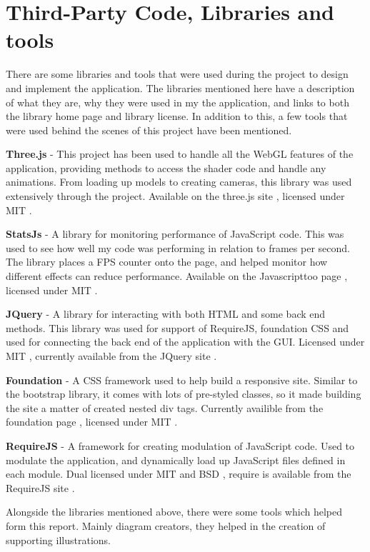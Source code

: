\chapter{Third-Party Code, Libraries and tools}
There are some libraries and tools that were used during the project to design and implement the application. The libraries mentioned here have a description of what they are, why they were used in my the application, and links to both the library home page and library license. In addition to this, a few tools that were used behind the scenes of this project have been mentioned. 

\textbf{Three.js} - This project has been used to handle all the WebGL features of the application, providing methods to access the shader code and handle any animations. From loading up models to creating cameras, this library was used extensively through the project. Available on the three.js site \cite{ThreeJs}, licensed under MIT \cite{MIT}.

\textbf{StatsJs} - A library for monitoring performance of JavaScript code. This was used to see how well my code was performing in relation to frames per second. The library places a FPS counter onto the page, and helped monitor how different effects can reduce performance. Available on the Javascripttoo page \cite{stats}, licensed under MIT \cite{MIT}.

\textbf{JQuery} - A library for interacting with both HTML and some back end methods. This library was used for support of RequireJS, foundation CSS and used for connecting the back end of the application with the GUI. Licensed under MIT \cite{MIT}, currently available from the JQuery site \cite{JQuery}.

\textbf{Foundation} - A CSS framework used to help build a responsive site. Similar to the bootstrap library, it comes with lots of pre-styled classes, so it made building the site a matter of created nested div tags. Currently availible from the foundation page \cite{foundation}, licensed under MIT \cite{MIT}.

\textbf{RequireJS} - A framework for creating modulation of JavaScript code. Used to modulate the application, and dynamically load up JavaScript files defined in each module. Dual licensed under MIT \cite{MIT} and BSD \cite{BSD}, require is available from the RequireJS site \cite{requirejs}.

Alongside the libraries mentioned above, there were some tools which helped form this report. Mainly diagram creators, they helped in the creation of supporting illustrations.

